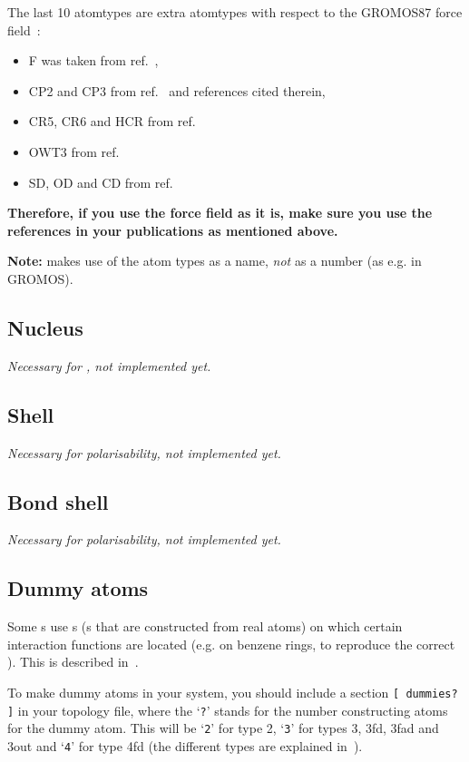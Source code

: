 The last 10 atomtypes are extra atomtypes with respect to the GROMOS87
force field~\cite{biomos}: 
\begin{itemize}
\item F was taken from ref.~\cite{Buuren93a}, 
\item CP2 and CP3 from ref.~\cite{Buuren93b} and references cited therein, 
\item CR5, CR6 and HCR from ref.~\cite{King93}
\item OWT3 from ref.~\cite{Jorgensen83}
\item SD, OD and CD from ref.~\cite{Liu95}
\end{itemize}
{\bf Therefore, if you use the {\gromacs} force field as it is, make
sure you use the references in your publications as mentioned above.}

{\bf Note:} {\gromacs} makes use of the atom types as a name, {\em
not} as a number (as e.g. in GROMOS).

\subsection{Nucleus}
{\em Necessary for , not implemented yet.}

\subsection{Shell}
{\em Necessary for polarisability, not implemented yet.}

\subsection{Bond shell}
{\em Necessary for polarisability, not implemented yet.}

\subsection{Dummy atoms}
\label{sec:dummytop}
Some s use s 
(s that are constructed
from real atoms) on which certain interaction functions are located
(e.g. on benzene rings, to reproduce the correct
). This is described in~.

To make dummy atoms in your system, you should include a section 
\verb'[ dummies? ]' in your topology file, where the `\verb|?|' stands for
the number constructing atoms for the dummy atom. This will be
`\verb|2|' for type 2, `\verb|3|' for types 3, 3fd, 3fad and 3out and
`\verb|4|' for type 4fd (the different types are explained
in~).

